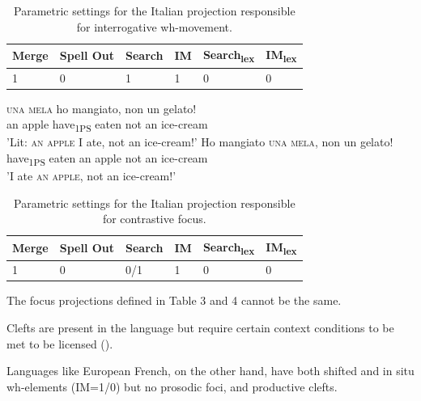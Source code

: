 \documentclass[fleqn,10pt]{wlscirep}
\begin{document}
\begin{table}[H]
    \centering
    \begin{tabular}{|l|l|l|l|l|l|}
    \hline
    Merge & Spell Out & Search & IM & Search\textsubscript{lex} & IM\textsubscript{lex} \\
    \hline
    1 & 0 & 1 & 1 & 0 & 0 \\
    \hline
    \end{tabular}
    \caption{\label{tab:samp}Parametric settings for the Italian projection responsible for interrogative wh-movement.}
\end{table}

\begin{exe}
    \ex
        \begin{xlist}
            \ex \gll \textsc{una} \textsc{mela} ho mangiato, non un gelato!\\
            an apple have\textsubscript{1PS} eaten not an ice-cream\\
            \glt 'Lit: \textsc{an} \textsc{apple} I ate, not an ice-cream!'
            \ex \gll Ho mangiato \textsc{una} \textsc{mela}, non un gelato!\\
            have\textsubscript{1PS} eaten an apple not an ice-cream\\
            \glt 'I ate \textsc{an} \textsc{apple}, not an ice-cream!'
        \end{xlist}
\end{exe}

\begin{table}[H]
    \centering
    \begin{tabular}{|l|l|l|l|l|l|}
    \hline
    Merge & Spell Out & Search & IM & Search\textsubscript{lex} & IM\textsubscript{lex} \\
    \hline
    1 & 0 & 0/1 & 1 & 0 & 0 \\
    \hline
    \end{tabular}
    \caption{\label{tab:samp}Parametric settings for the Italian projection responsible for contrastive focus.}
\end{table}

\noindent The focus projections defined in Table 3 and 4 cannot be the same.

\noindent Clefts are present in the language but require certain context conditions to be met to be licensed (\citealt{larrive2022}). 

\noindent Languages like European French, on the other hand, have both shifted and in situ wh-elements (IM=1/0) but no prosodic foci, and productive clefts. 
\end{document}
